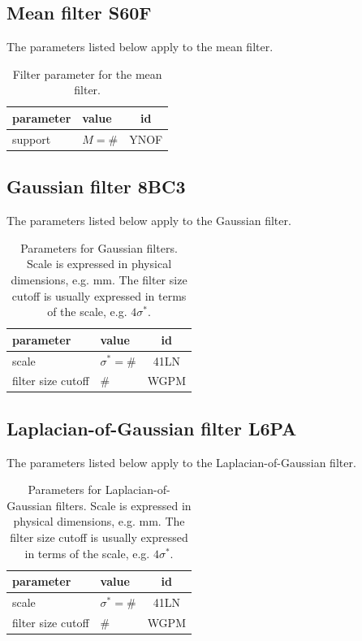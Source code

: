 \documentclass[fleqn,a4paper,oneside,openany]{book}
\newcommand\id[1]{{\hfill\normalsize{\idfont #1}}}
\newcommand\textid[1]{{\normalsize{\idfont #1}}}
\begin{document}
\FloatBarrier

\subsection[Mean filter]{Mean filter \id{S60F}}
The parameters listed below apply to the mean filter.

\begin{table}[ht]
\centering
\small
\begin{tabular}{llc}
\toprule
\textbf{parameter} & \textbf{value} & \textbf{id}\\
\midrule
support & \(M=\#\) & \textid{YNOF}\\
\bottomrule
\end{tabular}
\caption{Filter parameter for the mean filter.}
\end{table}

\FloatBarrier

\subsection[Gaussian filter]{Gaussian filter \id{8BC3}}
The parameters listed below apply to the Gaussian filter.

\begin{table}[ht]
\centering
\small
\begin{tabular}{llc}
\toprule
\textbf{parameter} & \textbf{value} & \textbf{id}\\
\midrule
scale & \(\sigma^*=\#\) & \textid{41LN}\\
filter size cutoff & \(\#\) & \textid{WGPM}\\
\bottomrule
\end{tabular}
\caption{Parameters for Gaussian filters. Scale is expressed in physical dimensions, e.g. mm. The filter size cutoff is usually expressed in terms of the scale, e.g. \(4 \sigma^*\).}
\end{table}

\FloatBarrier

\subsection[Laplacian-of-Gaussian filter ]{Laplacian-of-Gaussian filter \id{L6PA}}
The parameters listed below apply to the Laplacian-of-Gaussian filter.

\begin{table}[ht]
\centering
\small
\begin{tabular}{llc}
\toprule
\textbf{parameter} & \textbf{value} & \textbf{id}\\
\midrule
scale & \(\sigma^*=\#\) & \textid{41LN}\\
filter size cutoff & \(\#\) & \textid{WGPM}\\
\bottomrule
\end{tabular}
\caption{Parameters for Laplacian-of-Gaussian filters. Scale is expressed in physical dimensions, e.g. mm. The filter size cutoff is usually expressed in terms of the scale, e.g. \(4 \sigma^*\).}
\end{table}
\end{document}
